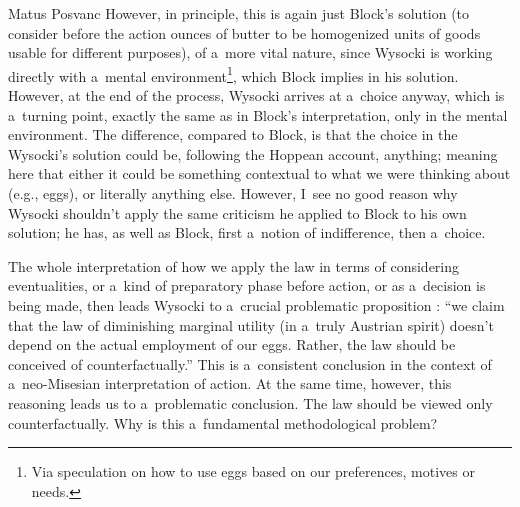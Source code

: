 \begin{artengenv}{Matus Posvanc}
However, in principle, this is again just Block's solution (to consider before the action ounces of butter to be homogenized units of goods usable for different purposes), of a~more vital nature, since Wysocki is working directly with a~mental environment\footnote{Via speculation on how to use eggs based on our preferences, motives or needs.}, which Block implies in his solution. However, at the end of the process, Wysocki arrives at a~choice anyway, which is a~turning point, exactly the same as in Block's interpretation, only in the mental environment. The difference, compared to Block, is that the choice in the Wysocki's solution could be, following the Hoppean account, anything; meaning here that either it could be something contextual to what we were thinking about (e.g., eggs), or literally anything else. However, I~see no good reason why Wysocki shouldn't apply the same criticism he applied to Block to his own solution; he has, as well as Block, first a~notion of indifference, then a~choice.



The whole interpretation of how we apply the law in terms of considering eventualities, or a~kind of preparatory phase before action, or as a~decision is being made, then leads Wysocki to a~crucial problematic proposition 
\parencite[][pp.41–42]{Wysocki2021problem}: %
 ``we claim that the law of diminishing marginal utility (in a~truly Austrian spirit) doesn't depend on the actual employment of our eggs. Rather, the law should be conceived of counterfactually.'' This is a~consistent conclusion in the context of a~neo-Misesian interpretation of action. At the same time, however, this reasoning leads us to a~problematic conclusion. The law should be viewed only counterfactually. Why is this a~fundamental methodological problem?




\end{artengenv}
